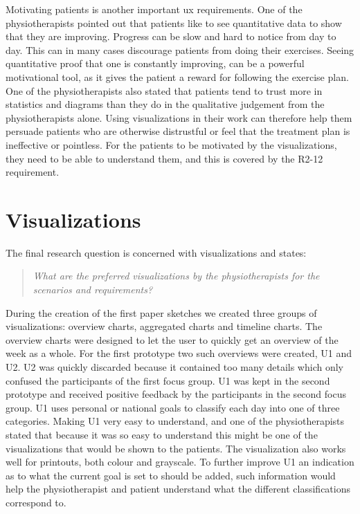 Motivating patients is another important \gls{ux} requirements. One of the physiotherapists pointed out that patients like to see quantitative data to show that they are improving. Progress can be slow and hard to notice from day to day. This can in many cases discourage patients from doing their exercises. Seeing quantitative proof that one is constantly improving, can be a powerful motivational tool, as it gives the patient a reward for following the exercise plan. One of the physiotherapists also stated that patients tend to trust more in statistics and diagrams than they do in the qualitative judgement from the physiotherapists alone. Using visualizations in their work can therefore help them persuade patients who are otherwise distrustful or feel that the treatment plan is ineffective or pointless. For the patients to be motivated by the visualizations, they need to be able to understand them, and this is covered by the R2-12 requirement. 

\section{Visualizations}
The final research question is concerned with visualizations and states:
\begin{quote}
  \textit{What are the preferred visualizations by the physiotherapists for the scenarios and requirements?}
\end{quote}

During the creation of the first paper sketches we created three groups of visualizations: overview charts, aggregated charts and timeline charts. The overview charts were designed to let the user to quickly get an overview of the week as a whole. For the first prototype two such overviews were created, U1 and U2. U2 was quickly discarded because it contained too many details which only confused the participants of the first focus group. U1 was kept in the second prototype and received positive feedback by the participants in the second focus group. U1 uses personal or national goals to classify each day into one of three categories. Making U1 very easy to understand, and one of the physiotherapists stated that because it was so easy to understand this might be one of the visualizations that would be shown to the patients. The visualization also works well for printouts, both colour and grayscale. To further improve U1 an indication as to what the current goal is set to should be added, such information would help the physiotherapist and patient understand what the different classifications correspond to.

